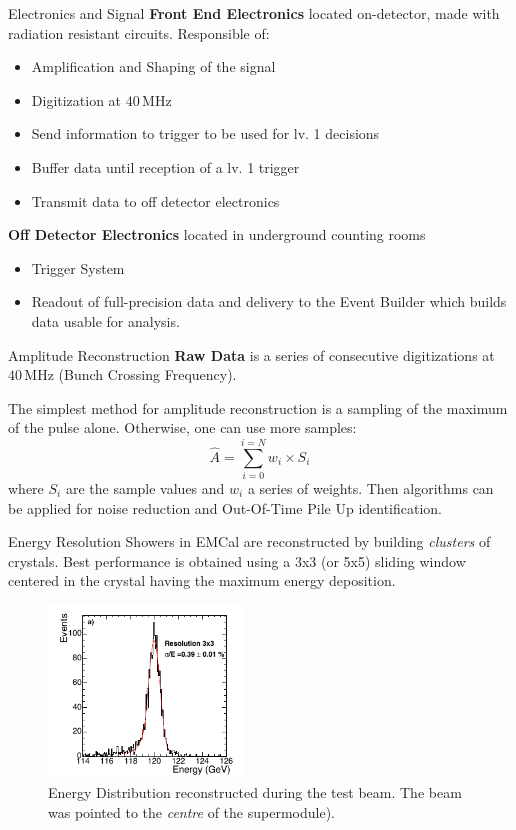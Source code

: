 \documentclass[10pt]{beamer}
\begin{document}
\begin{frame}{Electronics and Signal}
    \textbf{Front End Electronics} located on-detector, made with radiation resistant circuits. Responsible of:
    \begin{itemize}
        \item Amplification and Shaping of the signal
        \item Digitization at $40\,$MHz
        \item Send information to trigger to be used for lv. 1 decisions
        \item Buffer data until reception of a lv. 1 trigger
        \item Transmit data to off detector electronics
    \end{itemize}{}
    \textbf{Off Detector Electronics} located in underground counting rooms
    \begin{itemize}
        \item Trigger System
        \item Readout of full-precision data and delivery to the Event Builder which builds data usable for analysis.
    \end{itemize}
\end{frame}

\begin{frame}{Amplitude Reconstruction}
    \textbf{Raw Data} is a series of consecutive digitizations at $40\,$MHz (Bunch Crossing Frequency).
    
    The simplest method for amplitude reconstruction is a sampling of the maximum of the pulse alone.
    Otherwise, one can use more samples:
    \begin{equation}
        \hat{A} = \sum_{i=0}^{i=N} w_i \times S_i
    \end{equation}
    where $S_i$ are the sample values and $w_i$ a series of weights. Then algorithms can be applied for noise reduction and Out-Of-Time Pile Up identification.
\end{frame}

\begin{frame}{Energy Resolution}
    Showers in EMCal are reconstructed by building \emph{clusters} of crystals. Best performance is obtained using a 3x3 (or 5x5) sliding window centered in the crystal having the maximum energy deposition.
    \begin{figure}
        \centering
        \includegraphics[height=130pt]{./img/resolution_1.png}
        \caption{Energy Distribution reconstructed during the test beam. The beam was pointed to the \emph{centre} of the supermodule).}
        \label{fig:res1}
    \end{figure}{}
\end{frame}
\end{document}
